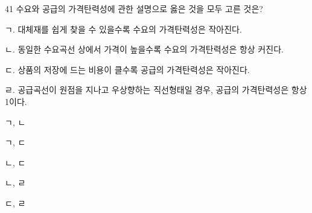 \begin{question}{41}
수요와 공급의 가격탄력성에 관한 설명으로 옳은 것을 모두 고른 것은?
\begin{framedtext}
ㄱ. 대체재를 쉽게 찾을 수 있을수록 수요의 가격탄력성은 작아진다. \par
ㄴ. 동일한 수요곡선 상에서 가격이 높을수록 수요의 가격탄력성은 항상 커진다. \par
ㄷ. 상품의 저장에 드는 비용이 클수록 공급의 가격탄력성은 작아진다. \par
ㄹ. 공급곡선이 원점을 지나고 우상향하는 직선형태일 경우, 공급의 가격탄력성은 항상 1이다.
\end{framedtext}
\begin{choices}
  \item ㄱ, ㄴ
  \item ㄱ, ㄷ
  \item ㄴ, ㄷ
  \item ㄴ, ㄹ
  \item ㄷ, ㄹ
\end{choices}
\end{question}
